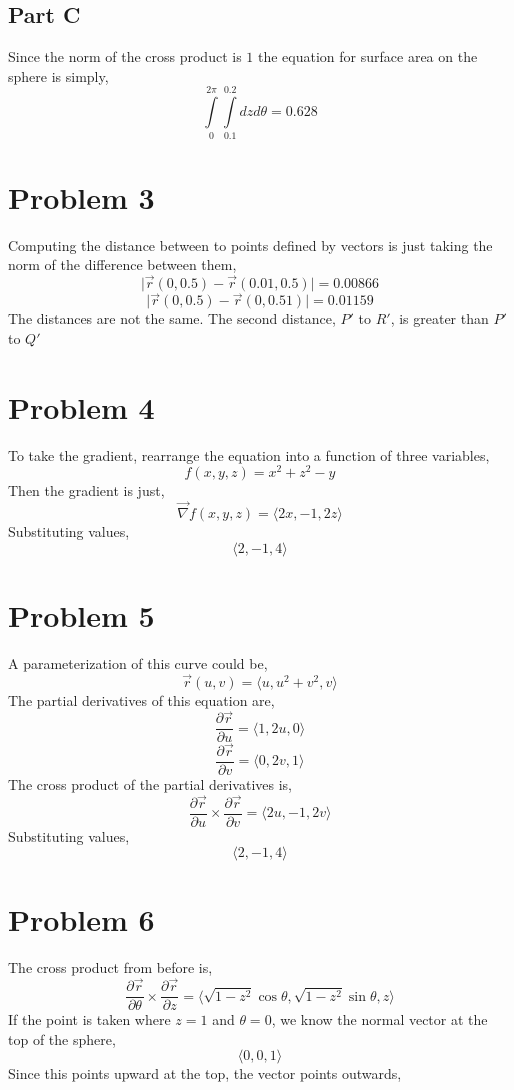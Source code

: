 \documentclass{article}
\begin{document}
\subsection*{Part C}

Since the norm of the cross product is $1$ the equation for surface area on the
sphere is simply,
$$ \int\limits_0^{2\pi}\int\limits_{0.1}^{0.2} dz d\theta = 0.628 $$

\section*{Problem 3}

Computing the distance between to points defined by vectors is just taking the
norm of the difference between them,
$$ \vert \vec{r}(0, 0.5) - \vec{r}(0.01, 0.5) \vert = 0.00866 $$
$$ \vert \vec{r}(0, 0.5) - \vec{r}(0,0.51) \vert = 0.01159 $$
The distances are not the same. The second distance, $P'$ to $R'$, is greater
than $P'$ to $Q'$

\section*{Problem 4}

To take the gradient, rearrange the equation into a function of three variables,
$$ f(x,y,z) = x^2 +z^2 - y $$
Then the gradient is just,
$$ \vec{\nabla}f(x, y, z) = \langle 2x, -1, 2z \rangle $$
Substituting values,
$$ \langle 2, -1, 4 \rangle $$

\section*{Problem 5}

A parameterization of this curve could be,
$$ \vec{r}(u, v) = \langle u, u^2 + v^2, v \rangle $$
The partial derivatives of this equation are,
$$ \frac{\partial \vec{r}}{\partial u} = \langle 1, 2u, 0 \rangle $$
$$ \frac{\partial \vec{r}}{\partial v} = \langle 0, 2v, 1 \rangle $$
The cross product of the partial derivatives is,
$$ \frac{\partial \vec{r}}{\partial u} \times \frac{\partial \vec{r}}{\partial
v}  = \langle 2u, -1, 2v \rangle $$
Substituting values,
$$ \langle 2, -1, 4 \rangle $$

\section*{Problem 6}

The cross product from before is,
$$ \frac{\partial \vec{r}}{\partial \theta} \times \frac{\partial
\vec{r}}{\partial z} = \langle \sqrt{1 - z^2} \cos \theta, \sqrt{1 - z^2} \sin
\theta, z \rangle $$
If the point is taken where $z = 1$ and $\theta = 0$, we know the normal vector
at the top of the sphere,
$$ \langle 0, 0, 1 \rangle $$
Since this points upward at the top, the vector points outwards,
\end{document}
